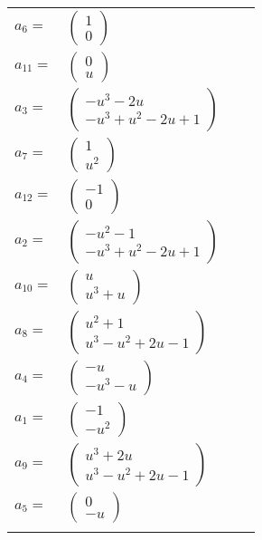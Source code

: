 \documentclass[1p]{elsarticle_modified}
\theoremstyle{definition}
\begin{document}
\begin{tabular}{m{7pt} m{180pt} m{7pt} m{180pt} }
\flushright $a_{6}=$&$\begin{pmatrix}1\\0\end{pmatrix}$ \\
\flushright $a_{11}=$&$\begin{pmatrix}0\\u\end{pmatrix}$ \\
\flushright $a_{3}=$&$\begin{pmatrix}- u^3-2 u\\- u^3+u^2-2 u+1\end{pmatrix}$ \\
\flushright $a_{7}=$&$\begin{pmatrix}1\\u^2\end{pmatrix}$ \\
\flushright $a_{12}=$&$\begin{pmatrix}-1\\0\end{pmatrix}$ \\
\flushright $a_{2}=$&$\begin{pmatrix}- u^2-1\\- u^3+u^2-2 u+1\end{pmatrix}$ \\
\flushright $a_{10}=$&$\begin{pmatrix}u\\u^3+u\end{pmatrix}$ \\
\flushright $a_{8}=$&$\begin{pmatrix}u^2+1\\u^3- u^2+2 u-1\end{pmatrix}$ \\
\flushright $a_{4}=$&$\begin{pmatrix}- u\\- u^3- u\end{pmatrix}$ \\
\flushright $a_{1}=$&$\begin{pmatrix}-1\\- u^2\end{pmatrix}$ \\
\flushright $a_{9}=$&$\begin{pmatrix}u^3+2 u\\u^3- u^2+2 u-1\end{pmatrix}$ \\
\flushright $a_{5}=$&$\begin{pmatrix}0\\- u\end{pmatrix}$\\&\end{tabular}
\end{document}
